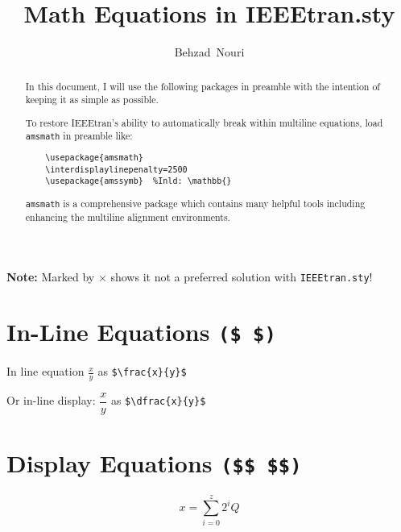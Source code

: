 \documentclass[journal]{IEEEtran}
\begin{document}
\title{Math Equations in IEEEtran.sty}
\author{Behzad~Nouri}
\maketitle
\begin{abstract}
	In this document, I will use the following packages in preamble with the intention of keeping it as simple as possible.
	
	To restore IEEEtran’s ability to automatically break within multiline equations, load \texttt{amsmath} in
	preamble like:
	\begin{verbatim}
	\usepackage{amsmath}
	\interdisplaylinepenalty=2500
	\usepackage{amssymb}  %Inld: \mathbb{}
	\end{verbatim}
\verb!amsmath! is a comprehensive package which contains many helpful tools including enhancing the multiline alignment environments.	
\end{abstract}

\bigskip
\par\noindent \dotfill
\par\noindent \textbf{Note:} Marked by {\color{red} \Large $\mathbf{\times}$} shows it not a preferred solution with \texttt{IEEEtran.sty}!
\par\noindent\dotfill

\tableofcontents


\newpage
\section{In-Line Equations \texttt{(\$ \$)}}
In line equation $\frac{x}{y}$ as \verb!$\frac{x}{y}$!\par
Or in-line display: $\dfrac{x}{y}$ as \verb!$\dfrac{x}{y}$!



\noindent \dotfill
\section{Display Equations \texttt{(\$\$ \$\$)}} \label{ch:display-eq}
\[x = \sum_{i=0}^{z} 2^{i}Q\]
\end{document}
